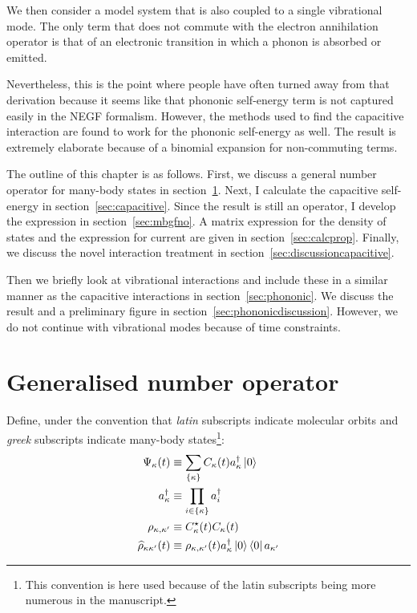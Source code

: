 We then consider a model system that is also coupled to a single vibrational mode. The only term that does not commute with the electron annihilation operator is that of an electronic transition in which a phonon is absorbed or emitted. 

Nevertheless, this is the point where people have often turned away from that derivation because it seems like that phononic self-energy term is not captured easily in the NEGF formalism. However, the methods used to find the capacitive interaction are found to work for the phononic self-energy as well. The result is extremely elaborate because of a binomial expansion for non-commuting terms. 

The outline of this chapter is as follows. First, we discuss a general number operator for many-body states in section~\ref{sec:gno}. Next, I calculate the capacitive self-energy in section~\ref{sec:capacitive}. Since the result is still an operator, I develop the expression in section~\ref{sec:mbgfno}. A matrix expression for the density of states and the expression for current are given in section~\ref{sec:calcprop}. Finally, we discuss the novel interaction treatment in section~\ref{sec:discussioncapacitive}.

Then we briefly look at vibrational interactions and include these in a similar manner as the capacitive interactions in section~\ref{sec:phononic}. We discuss the result and a preliminary figure in section~\ref{sec:phononicdiscussion}. However, we do not continue with vibrational modes because of time constraints.
\section{Generalised number operator}
\label{sec:gno}


Define, under the convention that \emph{latin} subscripts indicate molecular orbits and \emph{greek} subscripts indicate many-body states\footnote{This convention is here used because of the latin subscripts being more numerous in the manuscript.}:
\begin{align*}
\Psi_\kappa (t) &\equiv \sum_{ \left\{\kappa\right\}} C_\kappa(t) a_\kappa^\dagger \ket{0} \\
a^\dagger_\kappa &\equiv \prod_{ i \in \left\{\kappa\right\}} a_i^\dagger \\
\rho_{\kappa,\kappa^\prime} & \equiv C_\kappa^\star (t) C_\kappa (t)
\\
\widehat{\rho}_{\kappa\kappa^\prime}(t) &\equiv \rho_{\kappa,\kappa^\prime} (t) a_{\kappa}^\dagger \ket{0}\bra{0}a_{\kappa^\prime}
\end{align*}

